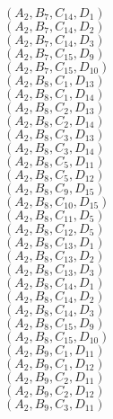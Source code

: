 \documentclass[14pt]{article}
\begin{document}
    $({A}_{2}, {B}_{7}, {C}_{14}, {D}_{1}) $ \\ 
    $({A}_{2}, {B}_{7}, {C}_{14}, {D}_{2}) $ \\ 
    $({A}_{2}, {B}_{7}, {C}_{14}, {D}_{3}) $ \\ 
    $({A}_{2}, {B}_{7}, {C}_{15}, {D}_{9}) $ \\ 
    $({A}_{2}, {B}_{7}, {C}_{15}, {D}_{10}) $ \\ 
    $({A}_{2}, {B}_{8}, {C}_{1}, {D}_{13}) $ \\ 
    $({A}_{2}, {B}_{8}, {C}_{1}, {D}_{14}) $ \\ 
    $({A}_{2}, {B}_{8}, {C}_{2}, {D}_{13}) $ \\ 
    $({A}_{2}, {B}_{8}, {C}_{2}, {D}_{14}) $ \\ 
    $({A}_{2}, {B}_{8}, {C}_{3}, {D}_{13}) $ \\ 
    $({A}_{2}, {B}_{8}, {C}_{3}, {D}_{14}) $ \\ 
    $({A}_{2}, {B}_{8}, {C}_{5}, {D}_{11}) $ \\ 
    $({A}_{2}, {B}_{8}, {C}_{5}, {D}_{12}) $ \\ 
    $({A}_{2}, {B}_{8}, {C}_{9}, {D}_{15}) $ \\ 
    $({A}_{2}, {B}_{8}, {C}_{10}, {D}_{15}) $ \\ 
    $({A}_{2}, {B}_{8}, {C}_{11}, {D}_{5}) $ \\ 
    $({A}_{2}, {B}_{8}, {C}_{12}, {D}_{5}) $ \\ 
    $({A}_{2}, {B}_{8}, {C}_{13}, {D}_{1}) $ \\ 
    $({A}_{2}, {B}_{8}, {C}_{13}, {D}_{2}) $ \\ 
    $({A}_{2}, {B}_{8}, {C}_{13}, {D}_{3}) $ \\ 
    $({A}_{2}, {B}_{8}, {C}_{14}, {D}_{1}) $ \\ 
    $({A}_{2}, {B}_{8}, {C}_{14}, {D}_{2}) $ \\ 
    $({A}_{2}, {B}_{8}, {C}_{14}, {D}_{3}) $ \\ 
    $({A}_{2}, {B}_{8}, {C}_{15}, {D}_{9}) $ \\ 
    $({A}_{2}, {B}_{8}, {C}_{15}, {D}_{10}) $ \\ 
    $({A}_{2}, {B}_{9}, {C}_{1}, {D}_{11}) $ \\ 
    $({A}_{2}, {B}_{9}, {C}_{1}, {D}_{12}) $ \\ 
    $({A}_{2}, {B}_{9}, {C}_{2}, {D}_{11}) $ \\ 
    $({A}_{2}, {B}_{9}, {C}_{2}, {D}_{12}) $ \\ 
    $({A}_{2}, {B}_{9}, {C}_{3}, {D}_{11}) $ \\ 
\end{document}
